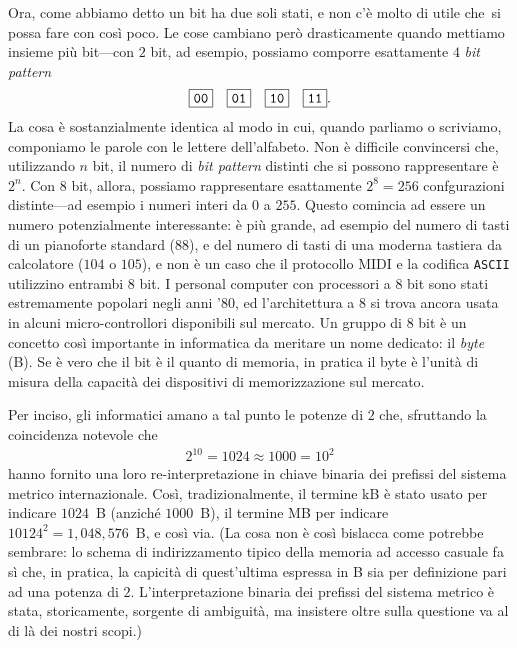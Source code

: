 Ora, come abbiamo detto un bit ha due soli stati, e non c'\`e molto di utile che\
si possa fare con cos\`i poco. Le cose cambiano per\`o drasticamente quando mettiamo
insieme pi\`u bit---con $2$ bit, ad esempio, possiamo comporre esattamente $4$
\emph{bit pattern}
\begin{align*}
  \byte{00} \quad \byte{01} \quad \byte{10} \quad \byte{11}.
\end{align*}
La cosa \`e sostanzialmente identica al modo in cui, quando parliamo o scriviamo,
componiamo le parole con le lettere dell'alfabeto. Non \`e difficile convincersi che,
utilizzando $n$ bit, il numero di \emph{bit pattern} distinti che si possono rappresentare
\`e $2^n$. Con $8$ bit, allora, possiamo rappresentare esattamente $2^8 = 256$ confgurazioni
distinte---ad esempio i numeri interi da $0$ a $255$. Questo comincia ad essere un
numero potenzialmente interessante: \`e pi\`u grande, ad esempio del numero di tasti
di un pianoforte standard ($88$), e del numero di tasti di una moderna tastiera
da calcolatore ($104$ o $105$), e non \`e un caso che il protocollo MIDI e la codifica
\texttt{ASCII} utilizzino entrambi $8$ bit. I personal computer con processori a $8$
bit sono stati estremamente popolari negli anni '80, ed l'architettura a $8$ si trova
ancora usata in alcuni micro-controllori disponibili sul mercato. Un gruppo di 8
bit \`e un concetto cos\`i importante in informatica da meritare un nome dedicato:
il \emph{byte} (B). Se \`e vero che il bit \`e il quanto di memoria, in pratica il
byte \`e l'unit\`a di misura della capacit\`a dei dispositivi di memorizzazione sul
mercato.

Per inciso, gli informatici amano a tal punto le potenze di $2$ che, sfruttando la coincidenza
notevole che
\begin{align*}
  2^{10} = 1024 \approx 1000 = 10^2
\end{align*}
hanno fornito una loro re-interpretazione in chiave binaria dei prefissi del sistema
metrico internazionale. Cos\`i, tradizionalmente, il termine kB \`e stato usato per
indicare $1024$~B (anzich\'e $1000$~B), il termine MB per indicare $10124^2 = 1,048,576$~B,
e cos\`i via. (La cosa non \`e cos\`i bislacca come potrebbe sembrare: lo schema di
indirizzamento tipico della memoria ad accesso casuale fa s\`i che, in pratica,
la capicit\`a di quest'ultima espressa in B sia per definizione pari ad una potenza
di $2$. L'interpretazione binaria dei prefissi del sistema metrico \`e stata, storicamente,
sorgente di ambiguit\`a, ma insistere oltre sulla questione va al di l\`a dei nostri
scopi.)

